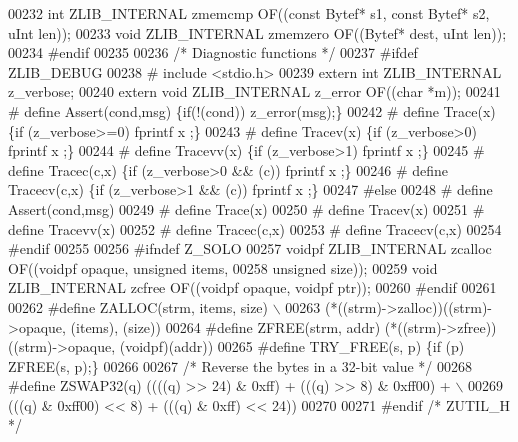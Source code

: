 \begin{DoxyCode}
00232    \textcolor{keywordtype}{int} ZLIB\_INTERNAL zmemcmp OF((\textcolor{keyword}{const} Bytef* s1, \textcolor{keyword}{const} Bytef* s2, uInt len));
00233    \textcolor{keywordtype}{void} ZLIB\_INTERNAL zmemzero OF((Bytef* dest, uInt len));
00234 \textcolor{preprocessor}{#endif}
00235 
00236 \textcolor{comment}{/* Diagnostic functions */}
00237 \textcolor{preprocessor}{#ifdef ZLIB\_DEBUG}
00238 \textcolor{preprocessor}{#  include <stdio.h>}
00239    \textcolor{keyword}{extern} \textcolor{keywordtype}{int} ZLIB\_INTERNAL z\_verbose;
00240    \textcolor{keyword}{extern} \textcolor{keywordtype}{void} ZLIB\_INTERNAL z\_error OF((\textcolor{keywordtype}{char} *m));
00241 \textcolor{preprocessor}{#  define Assert(cond,msg) \{if(!(cond)) z\_error(msg);\}}
00242 \textcolor{preprocessor}{#  define Trace(x) \{if (z\_verbose>=0) fprintf x ;\}}
00243 \textcolor{preprocessor}{#  define Tracev(x) \{if (z\_verbose>0) fprintf x ;\}}
00244 \textcolor{preprocessor}{#  define Tracevv(x) \{if (z\_verbose>1) fprintf x ;\}}
00245 \textcolor{preprocessor}{#  define Tracec(c,x) \{if (z\_verbose>0 && (c)) fprintf x ;\}}
00246 \textcolor{preprocessor}{#  define Tracecv(c,x) \{if (z\_verbose>1 && (c)) fprintf x ;\}}
00247 \textcolor{preprocessor}{#else}
00248 \textcolor{preprocessor}{#  define Assert(cond,msg)}
00249 \textcolor{preprocessor}{#  define Trace(x)}
00250 \textcolor{preprocessor}{#  define Tracev(x)}
00251 \textcolor{preprocessor}{#  define Tracevv(x)}
00252 \textcolor{preprocessor}{#  define Tracec(c,x)}
00253 \textcolor{preprocessor}{#  define Tracecv(c,x)}
00254 \textcolor{preprocessor}{#endif}
00255 
00256 \textcolor{preprocessor}{#ifndef Z\_SOLO}
00257    voidpf ZLIB\_INTERNAL zcalloc OF((voidpf opaque, \textcolor{keywordtype}{unsigned} items,
00258                                     \textcolor{keywordtype}{unsigned} size));
00259    \textcolor{keywordtype}{void} ZLIB\_INTERNAL zcfree  OF((voidpf opaque, voidpf ptr));
00260 \textcolor{preprocessor}{#endif}
00261 
00262 \textcolor{preprocessor}{#define ZALLOC(strm, items, size) \(\backslash\)}
00263 \textcolor{preprocessor}{           (*((strm)->zalloc))((strm)->opaque, (items), (size))}
00264 \textcolor{preprocessor}{#define ZFREE(strm, addr)  (*((strm)->zfree))((strm)->opaque, (voidpf)(addr))}
00265 \textcolor{preprocessor}{#define TRY\_FREE(s, p) \{if (p) ZFREE(s, p);\}}
00266 
00267 \textcolor{comment}{/* Reverse the bytes in a 32-bit value */}
00268 \textcolor{preprocessor}{#define ZSWAP32(q) ((((q) >> 24) & 0xff) + (((q) >> 8) & 0xff00) + \(\backslash\)}
00269 \textcolor{preprocessor}{                    (((q) & 0xff00) << 8) + (((q) & 0xff) << 24))}
00270 
00271 \textcolor{preprocessor}{#endif }\textcolor{comment}{/* ZUTIL\_H */}\textcolor{preprocessor}{}
\end{DoxyCode}
